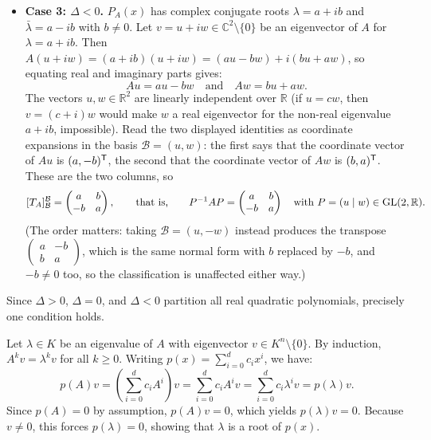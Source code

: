 \begin{exercisesolution}
\begin{itemize}
    \item \textbf{Case 3: $\Delta < 0$.}
    $P_A(x)$ has complex conjugate roots $\lambda = a + ib$ and $\bar{\lambda} = a - ib$ with $b \ne 0$.
    Let $v = u + iw \in \mathbb{C}^2 \setminus \{0\}$ be an eigenvector of $A$ for $\lambda = a + ib$.
    Then $A(u + iw) = (a + ib)(u + iw) = (au - bw) + i(bu + aw)$, so equating real and imaginary parts gives:
    \[
    Au = au - bw \quad \text{and} \quad Aw = bu + aw.
    \]
    The vectors $u, w \in \mathbb{R}^2$ are linearly independent over $\mathbb{R}$ (if $u = c w$, then $v = (c+i)w$ would make $w$ a real eigenvector for the non-real eigenvalue $a+ib$, impossible).
    Read the two displayed identities as coordinate expansions in the basis $\mathcal{B} = (u, w)$: the first says that the coordinate vector of $Au$ is $(a, -b)^{\mathsf{T}}$, the second that the coordinate vector of $Aw$ is $(b, a)^{\mathsf{T}}$. These are the two columns, so
    \[
    [T_A]_{\mathcal{B}}^{\mathcal{B}} = \begin{pmatrix} a & b \\ -b & a \end{pmatrix}, \qquad\text{that is,}\qquad P^{-1} A P = \begin{pmatrix} a & b \\ -b & a \end{pmatrix} \quad\text{with } P = (u \mid w) \in \operatorname{GL}(2, \mathbb{R}).
    \]
    (The order matters: taking $\mathcal{B} = (u, -w)$ instead produces the transpose $\left(\begin{smallmatrix} a & -b \\ b & a \end{smallmatrix}\right)$, which is the same normal form with $b$ replaced by $-b$, and $-b \ne 0$ too, so the classification is unaffected either way.)
\end{itemize}
Since $\Delta > 0$, $\Delta = 0$, and $\Delta < 0$ partition all real quadratic polynomials, precisely one condition holds.
\end{exercisesolution}

\begin{exercisesolution}
\label{sol:eigenvalues_are_roots_of_annihilating_polynomials}
Let $\lambda \in K$ be an eigenvalue of $A$ with eigenvector $v \in K^n \setminus \{0\}$.
By induction, $A^k v = \lambda^k v$ for all $k \ge 0$.
Writing $p(x) = \sum_{i=0}^d c_i x^i$, we have:
\[
p(A) v = \left(\sum_{i=0}^d c_i A^i\right) v = \sum_{i=0}^d c_i A^i v = \sum_{i=0}^d c_i \lambda^i v = p(\lambda) v.
\]
Since $p(A) = 0$ by assumption, $p(A) v = 0$, which yields $p(\lambda) v = 0$.
Because $v \ne 0$, this forces $p(\lambda) = 0$, showing that $\lambda$ is a root of $p(x)$.
\end{exercisesolution}

